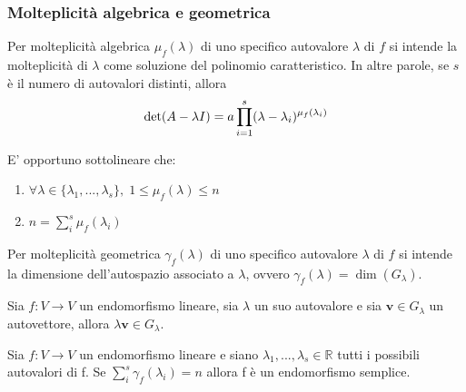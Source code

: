     \vspace{10pt}
    \subsubsection{Molteplicità algebrica e geometrica} \label{subsubsec:linappmultiplicity}
    Per molteplicità algebrica $\mu_f(\lambda)$ di uno specifico autovalore $\lambda$ di $f$ si intende la molteplicità di $\lambda$ come soluzione
    del polinomio caratteristico. In altre parole, se $s$ è il numero di autovalori distinti, allora
    \[
        \textnormal{det}(A - \lambda I) = a \displaystyle \prod_{i = 1}^{s} (\lambda - \lambda_i)^{\mu_f(\lambda_i)}
    \]

    E' opportuno sottolineare che:
    \begin{enumerate}[label=(\arabic*)]
        \item $\forall \lambda \in \{\lambda_1, ..., \lambda_s\}, \; 1 \leq \mu_f(\lambda) \leq n$
        \item $n = \displaystyle \sum_{i}^{s} \mu_f(\lambda_i)$
    \end{enumerate}

    \vspace{10pt}
    Per molteplicità geometrica $\gamma_{f}(\lambda)$ di uno specifico autovalore $\lambda$ di $f$ si intende la dimensione dell'autospazio associato a $\lambda$, ovvero $\gamma_{f}(\lambda) = \dim(G_{\lambda})$.

    \vspace{10pt}
    \begin{osservazione}
        Sia $f: V \rightarrow V$ un endomorfismo lineare, sia $\lambda$ un suo autovalore e sia $\mathbf{v} \in G_{\lambda}$ un autovettore, allora $\lambda \mathbf{v} \in G_{\lambda}$.
    \end{osservazione}

    \vspace{10pt}
    \begin{theorem} \label{thm:simple_decomposition}
        Sia $f : V \rightarrow V$ un endomorfismo lineare e siano $\lambda_1, ..., \lambda_s \in \mathbb{R}$ tutti i possibili autovalori di f. Se $\sum_{i}^{s} \gamma_f(\lambda_i) = n$ allora f è un endomorfismo semplice.
    \end{theorem}

